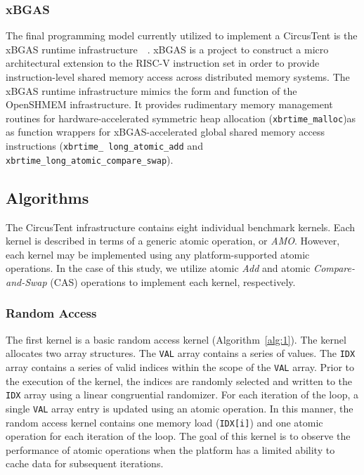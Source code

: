\subsubsection{xBGAS}
\label{subsubsec:xbgas}
The final programming model currently utilized to implement a CircusTent is 
the xBGAS runtime infrastructure~\cite{leidel2018xbgas}~\cite{xbgasspec}.  xBGAS 
is a project to construct a micro architectural extension to the RISC-V 
instruction set in order to provide instruction-level shared memory access 
across distributed memory systems.  The xBGAS runtime infrastructure mimics 
the form and function of the OpenSHMEM infrastructure.  It provides rudimentary 
memory management routines for hardware-accelerated symmetric heap allocation 
(\texttt{xbrtime\_malloc})as 
as function wrappers for xBGAS-accelerated global shared memory access 
instructions (\texttt{xbrtime\_ long\_atomic\_add} 
and \texttt{xbrtime\_long\_atomic\_compare\_swap}).  

\subsection{Algorithms}
\label{subsec:algorithms}

The CircusTent infrastructure contains eight individual benchmark kernels.
Each kernel is described in terms of a generic atomic operation, or \textit{AMO}.  
However, each kernel may be implemented using any platform-supported atomic operations.
In the case of this study, we utilize atomic \textit{Add} and atomic \textit{Compare-and-Swap} (CAS) operations to implement each kernel, respectively.  

\subsubsection{Random Access}
\label{subsubsec:random_access}

The first kernel is a basic random access kernel (Algorithm~\ref{alg:1}).
The kernel allocates two array structures.
The \texttt{VAL} array contains a series of values.
The \texttt{IDX} array contains a series of valid indices within the scope of 
the \texttt{VAL} array.
Prior to the execution of the kernel, the indices are randomly selected and 
written to the \texttt{IDX} array using a linear congruential randomizer.
For each iteration of the loop, a single \texttt{VAL} array entry is updated 
using an atomic operation.
In this manner, the random access kernel contains one memory load 
(\texttt{IDX[i]}) and one atomic operation for each iteration of the loop.
The goal of this kernel is to observe the performance of atomic operations 
when the platform has a limited ability to cache data for subsequent iterations.  

